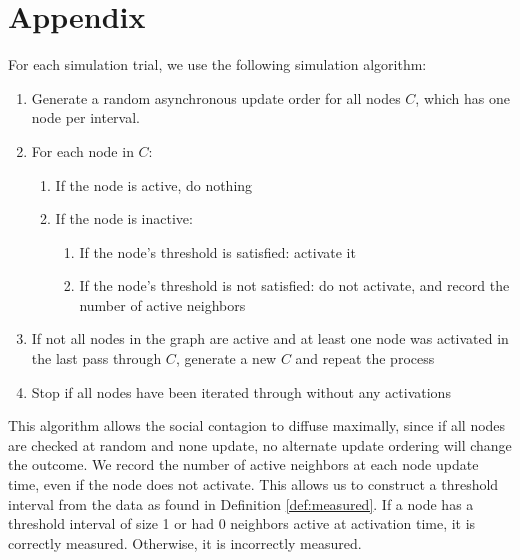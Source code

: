 \documentclass[a4paper]{article}
\newcommand\blankpage{%
    \null
    \thispagestyle{empty}%
    \addtocounter{page}{-1}%
    \newpage}
\begin{document}
\blankpage
\blankpage
\blankpage
\blankpage

\section{Appendix}

For each simulation trial, we use the following simulation algorithm:
\begin{enumerate}
\item Generate a random asynchronous update order for all nodes $C$, which has one node per interval.
\item For each node in $C$:
	\begin{enumerate}
	\item If the node is active, do nothing
    \item If the node is inactive:
    	\begin{enumerate}
        \item If the node's threshold is satisfied: activate it
        \item If the node's threshold is not satisfied: do not activate, and record the number of active neighbors
        \end{enumerate}
	\end{enumerate}
\item If not all nodes in the graph are active and at least one node was activated in the last pass through $C$, generate a new $C$ and repeat the process
\item Stop if all nodes have been iterated through without any activations
\end{enumerate}

\noindent
This algorithm allows the social contagion to diffuse maximally, since if all nodes are checked at random and none update, no alternate update ordering will change the outcome. We record the number of active neighbors at each node update time, even if the node does not activate. This allows us to construct a threshold interval from the data as found in Definition \ref{def:measured}. If a node has a threshold interval of size 1 or had 0 neighbors active at activation time, it is correctly measured. Otherwise, it is incorrectly measured.


\printbibliography
\end{document}
